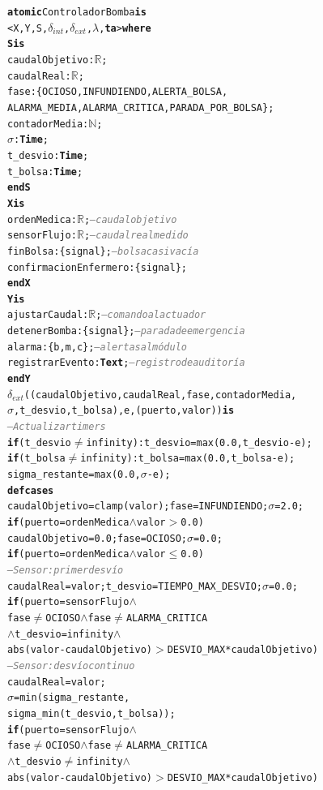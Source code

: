 \documentclass[12pt,a4paper]{article}
\newcommand{\cmlgt}{$>$}
\newcommand{\cmlle}{$\leq$}
\newcommand{\cmlN}{$\mathbb{N}$}
\newcommand{\cmlwedge}{$\wedge$}
\newcommand{\cmlneq}{$\neq$}
\newcommand{\kw}[1]{\textbf{#1}}
\newcommand{\cmlR}{$\mathbb{R}$}
\newcommand{\cmlTime}{\textbf{Time}}
\newcommand{\cmlsigma}{$\sigma$}
\newcommand{\dint}{$\delta_{\mathit{int}}$}
\newcommand{\dext}{$\delta_{\mathit{ext}}$}
\newcommand{\clambda}{$\lambda$}
\newcommand{\cmlta}{\textbf{ta}}
\newcommand{\cmlcomment}[1]{\textit{\textcolor{gray}{#1}}}
\newenvironment{cmldevs}{%
  \begin{alltt}\small%
}{%
  \end{alltt}%
}
\begin{document}
\begin{center}
\begin{cmldevs}
\kw{atomic} ControladorBomba \kw{is}
    <X, Y, S, \dint{}, \dext{}, \clambda{}, \cmlta{}> \kw{where}
\kw{S is}
    caudalObjetivo : \cmlR{};
    caudalReal     : \cmlR{};
    fase : \{OCIOSO, INFUNDIENDO, ALERTA\_BOLSA,
             ALARMA\_MEDIA, ALARMA\_CRITICA, PARADA\_POR\_BOLSA\};
    contadorMedia  : \cmlN{};
    \cmlsigma{}    : \cmlTime{};
    t\_desvio      : \cmlTime{};
    t\_bolsa       : \cmlTime{};
\kw{end S}
\kw{X is}
    ordenMedica           : \cmlR{};      \cmlcomment{-- caudal objetivo}
    sensorFlujo           : \cmlR{};      \cmlcomment{-- caudal real medido}
    finBolsa              : \{signal\};   \cmlcomment{-- bolsa casi vacía}
    confirmacionEnfermero : \{signal\};
\kw{end X}
\kw{Y is}
    ajustarCaudal   : \cmlR{};       \cmlcomment{-- comando al actuador}
    detenerBomba    : \{signal\};    \cmlcomment{-- parada de emergencia}
    alarma          : \{b, m, c\};   \cmlcomment{-- alertas al módulo}
    registrarEvento : \kw{Text};     \cmlcomment{-- registro de auditoría}
\kw{end Y}
\dext{}((caudalObjetivo, caudalReal, fase, contadorMedia,
         \cmlsigma{}, t\_desvio, t\_bolsa), e, (puerto, valor)) \kw{is}
    \cmlcomment{-- Actualizar timers}
    \kw{if} (t\_desvio \cmlneq{} infinity): t\_desvio = max(0.0, t\_desvio - e);
    \kw{if} (t\_bolsa  \cmlneq{} infinity): t\_bolsa  = max(0.0, t\_bolsa  - e);
    sigma\_restante = max(0.0, \cmlsigma{} - e);
    \kw{defcases}
        caudalObjetivo = clamp(valor); fase = INFUNDIENDO; \cmlsigma{} = 2.0;
            \kw{if} (puerto = ordenMedica \cmlwedge{} valor \cmlgt{} 0.0)
        caudalObjetivo = 0.0; fase = OCIOSO; \cmlsigma{} = 0.0;
            \kw{if} (puerto = ordenMedica \cmlwedge{} valor \cmlle{} 0.0)
        \cmlcomment{-- Sensor: primer desvío}
        caudalReal = valor; t\_desvio = TIEMPO\_MAX\_DESVIO; \cmlsigma{} = 0.0;
            \kw{if} (puerto = sensorFlujo \cmlwedge{}
            fase \cmlneq{} OCIOSO \cmlwedge{} fase \cmlneq{} ALARMA\_CRITICA
            \cmlwedge{} t\_desvio = infinity \cmlwedge{}
            abs(valor - caudalObjetivo) \cmlgt{} DESVIO\_MAX * caudalObjetivo)
        \cmlcomment{-- Sensor: desvío continuo}
        caudalReal = valor;
        \cmlsigma{} = min(sigma\_restante,
                     sigma\_min(t\_desvio, t\_bolsa));
            \kw{if} (puerto = sensorFlujo \cmlwedge{}
            fase \cmlneq{} OCIOSO \cmlwedge{} fase \cmlneq{} ALARMA\_CRITICA
            \cmlwedge{} t\_desvio \cmlneq{} infinity \cmlwedge{}
            abs(valor - caudalObjetivo) \cmlgt{} DESVIO\_MAX * caudalObjetivo)

\end{cmldevs}
\end{center}
\end{document}
